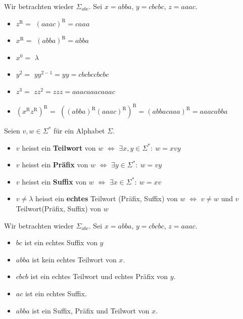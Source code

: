 
	Wir betrachten wieder $\Sigma_{abc}$. Sei $x = abba$, $y = cbcbc$, $z = aaac$.
	\begin{itemize}[label = -]
		\item $z^\text{R} =$  $ (aaac)^\text{R} = caaa$
		\item $x^\text{R} =$  $ (abba)^\text{R} = abba$
		\item $x^0 = $  $ \lambda$
		\item  $y^2 = $ $yy^{2-1}= yy = cbcbccbcbc$
		\item $z^3 =$  $zz^2= zzz = aaacaaacaaac$
		\item $(x^\text{R}z^\text{R})^\text{R} = $ $((abba)^\text{R}(aaac)^\text{R})^\text{R} = (abbacaaa)^\text{R} = aaacabba$
	\end{itemize}

	



	
	\begin{mainbox}{}
		Seien $v, w \in \Sigma^*$ für ein Alphabet $\Sigma$.
		\begin{itemize}[label=-]
			\item $v$ heisst ein \textbf{Teilwort} von $w$ $\iff$ $\exists x,y \in \Sigma^*: \ w = xvy$
			\item $v$ heisst ein \textbf{Präfix} von $w$ $\iff$ $\exists y \in \Sigma^*: \ w = vy$
			\item $v$ heisst ein \textbf{Suffix} von $w$ $\iff$ $\exists x \in \Sigma^*: \ w = xv$
			\item $v \neq \lambda$ heisst ein \textbf{echtes} Teilwort (Präfix, Suffix) von $w$ $\iff$ $v \neq w$ und $v$ Teilwort(Präfix, Suffix) von $w$
		\end{itemize}
	\end{mainbox}




	Wir betrachten wieder $\Sigma_{abc}$. Sei $x = abba$, $y = cbcbc$, $z = aaac$.
	\begin{itemize}[label=-]
		\item $bc$ ist ein echtes Suffix von $y$
		\item $abba$ ist kein echtes Teilwort von $x$.
		\item $cbcb$ ist ein echtes Teilwort und echtes Präfix von $y$.
		\item $ac$ ist ein echtes Suffix.
		\item $abba$ ist ein Suffix, Präfix und Teilwort von $x$.
	\end{itemize}

